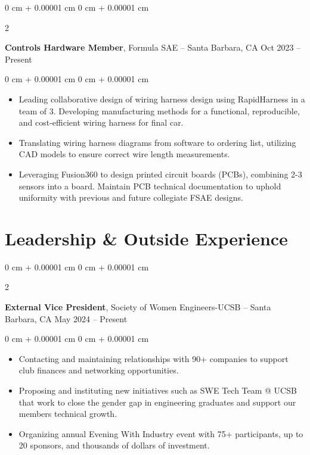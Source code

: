 \documentclass[10pt, letterpaper]{article}
\newenvironment{highlights}{
    \begin{itemize}[
        topsep=0.10 cm,
        parsep=0.10 cm,
        partopsep=0pt,
        itemsep=0pt,
        leftmargin=0 cm + 10pt
    ]
}{
    \end{itemize}
} %
\newenvironment{onecolentry}{
    \begin{adjustwidth}{
        0 cm + 0.00001 cm
    }{
        0 cm + 0.00001 cm
    }
}{
    \end{adjustwidth}
} %
\newenvironment{twocolentry}[2][]{
    \onecolentry
    \def\secondColumn{#2}
    \setcolumnwidth{\fill, 4.5 cm}
    \begin{paracol}{2}
}{
    \switchcolumn \raggedleft \secondColumn
    \end{paracol}
    \endonecolentry
} %
\begin{document}
        \vspace{0.2 cm}



    \begin{twocolentry}{
        Oct 2023 – Present
    }
    
    \textbf{Controls Hardware Member}, Formula SAE -- Santa Barbara, CA\end{twocolentry}

    \vspace{0.10 cm}
    \begin{onecolentry}
        \begin{highlights}
            \item Leading collaborative design of wiring harness design using RapidHarness in a team of 3. Developing manufacturing methods for a functional, reproducible, and cost-efficient wiring harness for final car.
            \item Translating wiring harness diagrams from software to ordering list, utilizing CAD models to ensure correct wire length measurements. 
            \item Leveraging Fusion360 to design printed circuit boards (PCBs), combining 2-3 sensors into a board. Maintain PCB technical documentation to uphold uniformity with previous and future collegiate FSAE designs.
        \end{highlights}
    \end{onecolentry}



    





    \section{Leadership \& Outside Experience}

        \begin{twocolentry}{
            May 2024 – Present
        }
            \textbf{External Vice President}, Society of Women Engineers-UCSB -- Santa Barbara, CA\end{twocolentry}

        \vspace{0.10 cm}
        \begin{onecolentry}
            \begin{highlights}
                \item Contacting and maintaining relationships with 90+ companies to support club finances and networking opportunities.
                \item Proposing and instituting new initiatives such as SWE Tech Team @ UCSB that work to close the gender gap in engineering graduates and support our members technical growth.
                \item Organizing annual Evening With Industry event with 75+ participants, up to 20 sponsors, and thousands of dollars of investment.
            \end{highlights}
        \end{onecolentry}
\end{document}
